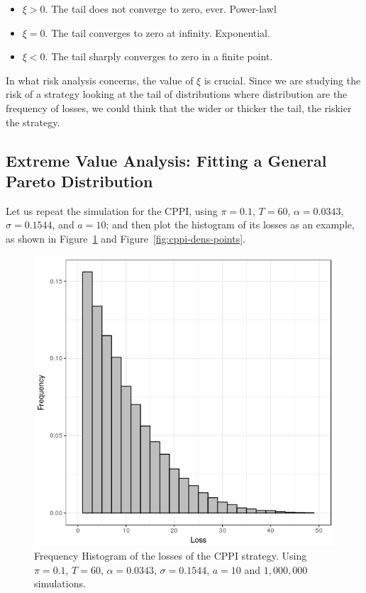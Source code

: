 \begin{itemize}
    \item $\xi > 0$. The tail does not converge to zero, ever. Power-lawl
    \item $\xi = 0$. The tail converges to zero at infinity. Exponential.
    \item $\xi < 0$. The tail sharply converges to zero in a finite point.
\end{itemize}

In what risk analysis concerns, the value of $\xi$ is crucial. Since we are studying the risk of a strategy looking at the tail of distributions where distribution are the frequency of losses, we could think that the wider or thicker the tail, the riskier the strategy.

\subsection{Extreme Value Analysis: Fitting a General Pareto Distribution}

Let us repeat the simulation for the CPPI, using $\pi = 0.1$, $T=60$, $\alpha = 0.0343$, $\sigma = 0.1544$, and $a=10$; and then plot the histogram of its losses as an example, as shown in Figure~\ref{fig:cppi-losses-histogram} and Figure~\ref{fig:cppi-dens-points}.

\begin{figure}[h]
    \centering
    \includegraphics[scale=0.75]{images/cppi-losses-hist.png}
    \caption{Frequency Histogram of the losses of the CPPI strategy. Using $\pi = 0.1$, $T=60$, $\alpha = 0.0343$, $\sigma = 0.1544$, $a=10$ and $1,000,000$ simulations.}
    \label{fig:cppi-losses-histogram}
\end{figure}

